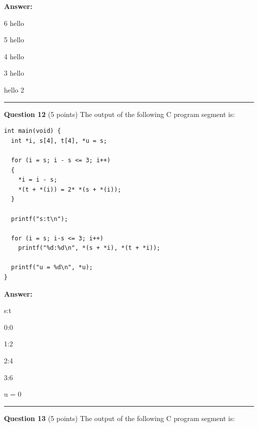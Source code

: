 \documentclass{exam}
\begin{document}
\textbf{Answer:}

6 hello

5 hello

4 hello

3 hello

hello 2

\newpage






\begin{center}\noindent\rule{6in}{0.4pt}\end{center}

\textbf{Question 12} (5 points) The output of the following C program segment is:

\begin{lstlisting}
int main(void) {
  int *i, s[4], t[4], *u = s;
  
  for (i = s; i - s <= 3; i++) 
  {
    *i = i - s;
    *(t + *(i)) = 2* *(s + *(i));
  }
  
  printf("s:t\n");
  
  for (i = s; i-s <= 3; i++) 
    printf("%d:%d\n", *(s + *i), *(t + *i));
    
  printf("u = %d\n", *u);
}
\end{lstlisting}

\textbf{Answer:}

s:t

0:0

1:2

2:4

3:6

u = 0

\newpage




\begin{center}\noindent\rule{6in}{0.4pt}\end{center}

\textbf{Question 13} (5 points) The output of the following C program segment is:
\end{document}
